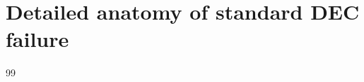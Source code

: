 \documentclass[preprint,12pt]{elsarticle}
\begin{document}
%
%
%
%

\section{Detailed anatomy of standard DEC failure}
\label{app:std_anatomy}

%
%


\begin{thebibliography}{99}
\end{thebibliography}
\end{document}
